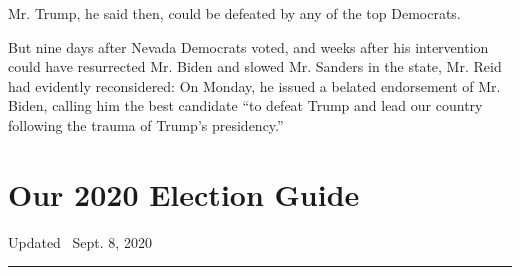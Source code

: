 Mr. Trump, he said then, could be defeated by any of the top Democrats.

But nine days after Nevada Democrats voted, and weeks after his
intervention could have resurrected Mr. Biden and slowed Mr. Sanders in
the state, Mr. Reid had evidently reconsidered: On Monday, he issued a
belated endorsement of Mr. Biden, calling him the best candidate ``to
defeat Trump and lead our country following the trauma of Trump's
presidency.''

\hypertarget{our-2020-election-guide}{%
\section{Our 2020 Election Guide}\label{our-2020-election-guide}}

Updated ~Sept. 8, 2020

\begin{center}\rule{0.5\linewidth}{\linethickness}\end{center}

